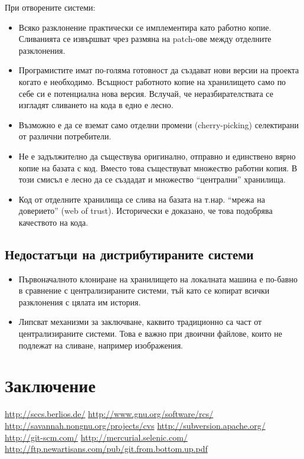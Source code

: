 \documentclass[a4paper]{article}
\begin{document}
      При отворените системи:
      \begin{itemize}
        \item Всяко разклонение практически се имплементира като работно копие. Сливанията се извършват чрез размяна на patch-ове между отделните разклонения.
        \item Програмистите имат по-голяма готовност да създават нови версии на проекта когато е необходимо. Всъщност работното копие на хранилището само по себе си е потенциална нова версия. Вслучай, че неразбирателствата се изгладят сливането на кода в едно е лесно.
        \item Възможно е да се вземат само отделни промени (cherry-picking) селектирани от различни потребители.
        \item Не е задължително да съществува оригинално, отправно и единствено вярно копие на базата с код. Вместо това съществуват множество работни копия. В този смисъл е лесно да се създадат и множество ``централни'' хранилища.
        \item Код от отделните хранилища се слива на базата на т.нар. ``мрежа на доверието'' (web of trust). Исторически е доказано, че това подобрява качеството на кода.
      \end{itemize}

  \subsection{Недостатъци на дистрибутираните системи}
    \begin{itemize}
      \item Първоначалното клониране на хранилището на локалната машина е по-бавно в сравнение с централизираните системи, тъй като се копират всички разклонения с цялата им история.
      \item Липсват механизми за заключване, каквито традиционно са част от централизираните системи. Това е важно при двоични файлове, които не подлежат на сливане, например изображения.
    \end{itemize}

\section{Заключение}

\newpage

\begin{thebibliography}{99}
   \url{http://sccs.berlios.de/}
   \url{http://www.gnu.org/software/rcs/}
   \url{http://savannah.nongnu.org/projects/cvs}
   \url{http://subversion.apache.org/}
   \url{http://git-scm.com/}
   \url{http://mercurial.selenic.com/}
   \url{http://ftp.newartisans.com/pub/git.from.bottom.up.pdf}
\end{thebibliography}
\end{document}
